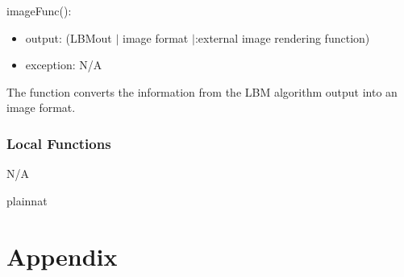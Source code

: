 \documentclass[12pt, titlepage]{article}
\begin{document}
\noindent imageFunc():
\begin{itemize}
	\item output: (LBMout $|$ image format $|$:external image rendering function)
	\item exception: N/A
\end{itemize}

The function converts the information from the LBM algorithm output into an image format.

\subsubsection{Local Functions}
N/A

\newpage

 {plainnat}


\newpage

\section{Appendix} \label{Appendix}

\end{document}

